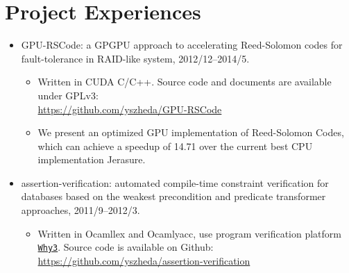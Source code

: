 \documentclass[letterpaper]{article}
\begin{document}
\section*{Project Experiences}
\begin{itemize}
    \item GPU-RSCode: a GPGPU approach to accelerating Reed-Solomon codes for fault-tolerance in RAID-like system, 2012/12--2014/5.
        \begin{itemize}
            \item Written in CUDA C/C++. Source code and documents are available under GPLv3: \\ \url{https://github.com/yszheda/GPU-RSCode}
            \item We present an optimized GPU implementation of Reed-Solomon Codes, which can achieve a speedup of 14.71 over the current best CPU implementation Jerasure.
        \end{itemize}
    \item assertion-verification: automated compile-time constraint verification for databases based on the weakest precondition and predicate transformer approaches, 2011/9--2012/3.
        \begin{itemize}
            \item Written in Ocamllex and Ocamlyacc, use program verification platform \href{http://why3.lri.fr/}{\tt Why3}. Source code is available on Github: \\ \url{https://github.com/yszheda/assertion-verification}
        \end{itemize}

\end{itemize}
\end{document}
